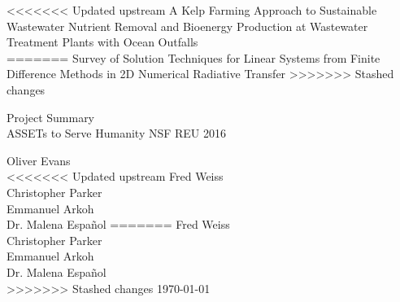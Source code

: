 \documentclass[10pt]{article}
\begin{document}
\null

\thispagestyle{empty}
\addtocounter{page}{-1}

\begin{center}
    \begin{sffamily}
	\begin{bfseries}
	    \null
	    \vfill
<<<<<<< Updated upstream
	    \Huge{A Kelp Farming Approach to Sustainable Wastewater Nutrient Removal and Bioenergy Production at Wastewater Treatment Plants with Ocean Outfalls} \\
=======
		\Huge{Survey of Solution Techniques for Linear Systems from Finite Difference Methods in 2D Numerical Radiative Transfer}
>>>>>>> Stashed changes

	    \vspace{20pt}
	    \LARGE{Project Summary} \\
		\LARGE{ASSETs to Serve Humanity NSF REU 2016} \\
	    \vspace{20pt}
    \begin{Large}
		Oliver Evans \\
<<<<<<< Updated upstream
                Fred Weiss \\
                Christopher Parker \\
                Emmanuel Arkoh \\[1em]
                Dr. Malena Espa\~nol
=======
		Fred Weiss \\
		Christopher Parker \\
		Emmanuel Arkoh \\[1em]

		Dr. Malena Espa\~nol \\
>>>>>>> Stashed changes
	\vspace{20pt}
	\today
    \end{Large}
	\end{bfseries}
    \end{sffamily}
    \vspace{30pt}

    \null
    \vfill
    \vfill
    \null
\end{center}
\pagebreak


\renewcommand{\arraystretch}{1.5}
\end{document}
